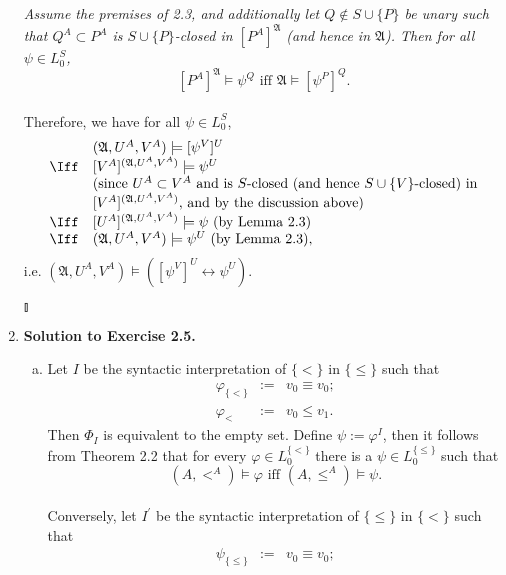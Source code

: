 \begin{enumerate}[1.]
\textit{Assume the premises of 2.3, and additionally let $Q \not \in S \cup \{ P \}$ be unary such that $Q^A \subset P^A$ is $S \cup \{ P \}$-closed in $[P^A]^{\mathfrak{A}}$ (and hence in $\mathfrak{A}$). Then for all $\psi \in L^S_0$,
\[
\mbox{$[P^A]^{\mathfrak{A}} \models \psi^Q$ iff $\mathfrak{A} \models [\psi^P]^Q$}.
\]
}\\
Therefore, we have for all $\psi \in L^S_0$,
\[
\begin{array}{ll}
\    & (\mathfrak{A}, U^A, V^A) \models [\psi^V]^U \\
\Iff & [V^A]^{(\mathfrak{A}, U^A, V^A)} \models \psi^U \\
\    & \mbox{(since $U^A \subset V^A$ and is $S$-closed (and hence $S \cup \{ V \}$-closed) in} \\
\    & \mbox{$[V^A]^{(\mathfrak{A}, U^A, V^A)}$, and by the discussion above)} \\
\Iff & \mbox{$[U^A]^{(\mathfrak{A}, U^A, V^A)} \models \psi$ (by Lemma 2.3)} \\
\Iff & \mbox{$(\mathfrak{A}, U^A, V^A) \models \psi^U$ (by Lemma 2.3)},
\end{array}
\]
i.e. $(\mathfrak{A}, U^A, V^A) \models ([\psi^V]^U \leftrightarrow \psi^U)$. \begin{flushright}$\talloblong$\end{flushright}
%
\item \textbf{Solution to Exercise 2.5.}
\begin{enumerate}[(a)]
\item Let $I$ be the syntactic interpretation of $\{ < \}$ in $\{ \leq \}$ such that
\[
\begin{array}{lll}
\varphi_{\{ < \}} & := & v_0 \equiv v_0; \\
\varphi_<         & := & v_0 \leq v_1.
\end{array}
\]
Then $\Phi_I$ is equivalent to the empty set. Define $\psi := \varphi^I$, then it follows from Theorem 2.2 that for every $\varphi \in L_0^{\{ < \}}$ there is a $\psi \in L_0^{\{ \leq \}}$ such that
\[
\mbox{$(A, <^A) \models \varphi$ iff $(A, \leq^A) \models \psi$}.
\]
\ 
\\
Conversely, let $I^\prime$ be the syntactic interpretation of $\{ \leq \}$ in $\{ < \}$ such that
\[
\begin{array}{lll}
\psi_{\{ \leq \}} & := & v_0 \equiv v_0; \\

\end{array}\]
\end{enumerate}
\end{enumerate}

